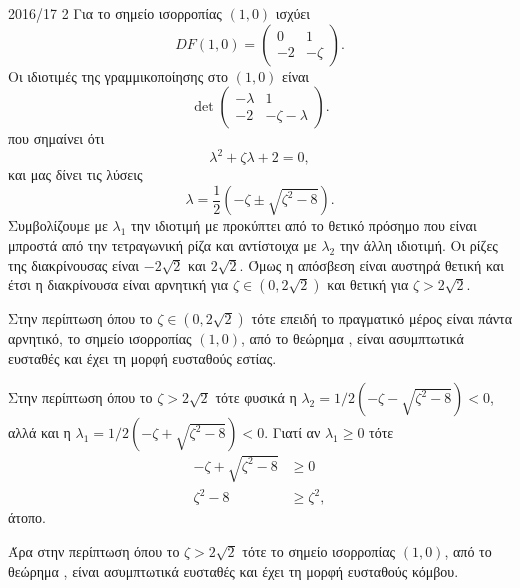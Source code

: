 \begin{solution}{2016/17 2}
    Για το σημείο ισορροπίας \( (1, 0) \) ισχύει
    \begin{equation*}
        DF(1, 0) =
        \begin{pmatrix}
            0 & 1 \\
            -2 & -\zeta
        \end{pmatrix}.
    \end{equation*}
    Οι ιδιοτιμές της γραμμικοποίησης στο \( (1, 0) \) είναι
    \begin{equation*}
        \det
        \begin{pmatrix}
            -\lambda & 1 \\
            -2 & -\zeta - \lambda
        \end{pmatrix}.
    \end{equation*}
    που σημαίνει ότι
    \begin{equation*}
        \lambda^2 + \zeta \lambda + 2 = 0,
    \end{equation*}
    και μας δίνει τις λύσεις
    \begin{equation*}
        \lambda = \frac{1}{2}\left( -\zeta \pm \sqrt{\zeta^2 - 8} \right).
    \end{equation*}
    Συμβολίζουμε με \( \lambda_1 \) την ιδιοτιμή με προκύπτει από το θετικό
    πρόσημο που είναι μπροστά από την τετραγωνική ρίζα και αντίστοιχα με
    \( \lambda_2 \) την άλλη ιδιοτιμή. Οι ρίζες της διακρίνουσας είναι \(
    -2\sqrt{2} \) και \( 2\sqrt{2} \). Όμως η απόσβεση είναι αυστηρά θετική και
    έτσι η διακρίνουσα είναι αρνητική για \( \zeta \in (0, 2\sqrt{2}) \) και
    θετική για \( \zeta > 2\sqrt{2} \).

    Στην περίπτωση όπου το \( \zeta \in (0, 2\sqrt{2}) \) τότε επειδή
    το πραγματικό μέρος είναι πάντα αρνητικό, το σημείο ισορροπίας \( (1,
    0) \), από το θεώρημα , είναι ασυμπτωτικά ευσταθές
    και έχει τη μορφή ευσταθούς εστίας.

    Στην περίπτωση όπου το \( \zeta > 2\sqrt{2} \) τότε φυσικά η \( \lambda_2 =
    1/2 \left( -\zeta - \sqrt{\zeta^2 - 8} \right) < 0 \), αλλά και η \( \lambda_1 =
    1/2 \left( -\zeta +\sqrt{\zeta^2 - 8} \right) < 0 \). Γιατί αν \( \lambda_1
    \geq 0 \) τότε
    \begin{align*}
        -\zeta + \sqrt{\zeta^2 - 8} &\geq 0 \\
        \zeta^2 - 8 &\geq \zeta^2,
    \end{align*}
    άτοπο.

    Άρα στην περίπτωση όπου το \( \zeta > 2\sqrt{2} \) τότε το σημείο
    ισορροπίας \( (1, 0) \), από το θεώρημα , είναι
    ασυμπτωτικά ευσταθές και έχει τη μορφή ευσταθούς κόμβου.


\end{solution}

